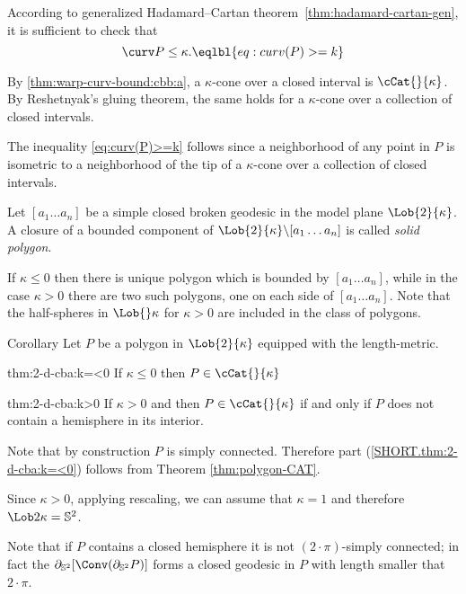  According to  generalized Hadamard--Cartan theorem~\ref{thm:hadamard-cartan-gen},
it is sufficient to check that 
\[\curv P\le \kappa.
\eqlbl{eq:curv(P)>=k}\]

By \ref{thm:warp-curv-bound:cbb:a}, a $\kappa$-cone over
a closed interval is $\cCat{}{\kappa}$.
By Reshetnyak's gluing theorem, 
the same holds for a $\kappa$-cone over
a collection of closed intervals.

The inequality \ref{eq:curv(P)>=k} follows 
since a neighborhood of any point in $P$
is isometric to a neighborhood of the tip of a $\kappa$-cone over
a collection of closed intervals.
\qeds


Let $[a_1\dots a_n]$
be a simple closed broken geodesic in the model plane $\Lob{2}{\kappa}$.
A closure  
of a bounded component of 
$\Lob{2}{\kappa}\backslash [a_1\dots a_n]$ 
is called \emph{solid polygon}.

If $\kappa\le 0$ then there is unique polygon which is bounded by $[a_1\dots a_n]$,
while in the case $\kappa>0$
there are two such polygons,
one on each side of $[a_1\dots a_n]$.
Note that the half-spheres in $\Lob{}\kappa$ for $\kappa>0$ are included in the class of polygons.


\begin{thm}{Corollary}\label{thm:2-d-cba}
Let $P$ be a polygon in $\Lob{2}{\kappa}$ equipped with the length-metric. 
\begin{subthm}{thm:2-d-cba:k=<0} 
If $\kappa\le 0$ then $P\in\cCat{}{\kappa}$ 
\end{subthm}
\begin{subthm}{thm:2-d-cba:k>0}
If $\kappa> 0$ and then $P\in\cCat{}{\kappa}$ if and only if $P$ does not contain a hemisphere in its interior. 
\end{subthm}
\end{thm}

Note that by construction $P$ is simply connected.
Therefore part (\ref{SHORT.thm:2-d-cba:k=<0})
follows from Theorem \ref{thm:polygon-CAT}.

Since $\kappa>0$,
applying rescaling, we can assume that $\kappa=1$ and therefore $\Lob2\kappa=\mathbb{S}^2$.

Note that if $P$ contains a closed hemisphere it is not $(2\cdot\pi)$-simply connected;
in fact the $\partial_{\mathbb{S}^2}[\Conv(\partial_{\mathbb{S}^2} P)]$ forms a closed geodesic in $P$ with length smaller that $2\cdot\pi$.

